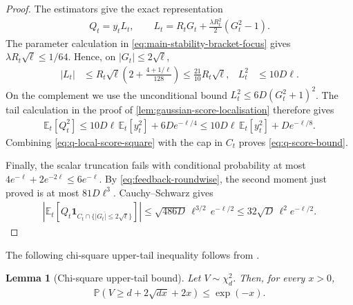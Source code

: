 \documentclass{article}
\newtheorem{lemma}[lemma]{Lemma}
\newcommand{\E}{\mathbb E}
\newcommand{\Pp}{\mathbb P}
\newcommand{\1}{\mathbf 1}
\begin{document}
\begin{proof}
    The estimators give the exact representation
    \begin{align}
        Q_t=y_tL_t,
        \qquad
        L_t=R_tG_t+\frac{\lambda R_t^2}{2}(G_t^2-1).
        \label{eq:q-score-representation}
    \end{align}
    The parameter calculation in
    \eqref{eq:main-stability-bracket-focus} gives
    $\lambda R_t\sqrt\ell\leq1/64$. Hence, on $|G_t|\leq2\sqrt\ell$,
    \begin{align}
        |L_t|
         & \leq R_t\sqrt\ell\left(2+\frac{4+1/\ell}{128}\right)
        \leq\frac{21}{10}R_t\sqrt\ell,
         & L_t^2                                                & \leq10D\ell.
        \label{eq:q-local-score-square}
    \end{align}
    On the complement we use the unconditional bound
    $L_t^2\leq6D(G_t^2+1)^2$. The tail calculation in the proof of
    \cref{lem:gaussian-score-localisation} therefore gives
    \begin{align}
        \E_t[Q_t^2]
        \leq10D\ell\,\E_t[y_t^2]+6De^{-\ell/4}
        \leq10D\ell\,\E_t[y_t^2]+De^{-\ell/8}.
    \end{align}
    Combining \eqref{eq:q-local-score-square} with the cap in $C_t$
    proves \eqref{eq:q-score-bound}.

    Finally, the scalar truncation fails with conditional probability at
    most $4e^{-\ell}+2e^{-2\ell}\leq6e^{-\ell}$.
    By \eqref{eq:feedback-roundwise}, the second moment just proved is
    at most $81D\ell^3$. Cauchy--Schwarz gives
    \begin{align}
        \left|\E_t\left[Q_t\1_{\overline{C_t\cap\{|G_t|\leq2\sqrt\ell\}}}\right]\right|
        \leq\sqrt{486D}\,\ell^{3/2}\,e^{-\ell/2}
        \leq32\sqrt D\,\ell^2 e^{-\ell/2}.
    \end{align}
\end{proof}

The following chi-square upper-tail inequality follows from
\citet[Lemma~1 and Eq.~(4.3)]{laurent2000adaptive}.
\begin{lemma}[Chi-square upper-tail bound]
    \label{lem:chi-square-upper-tail}
    Let $V\sim\chi_d^2$. Then, for every $x>0$,
    \begin{align}
        \Pp\left(
        V\geq d+2\sqrt{dx}+2x
        \right)
        \leq
        \exp(-x).
        \label{eq:chi-square-upper-tail}
    \end{align}
\end{lemma}
\end{document}
